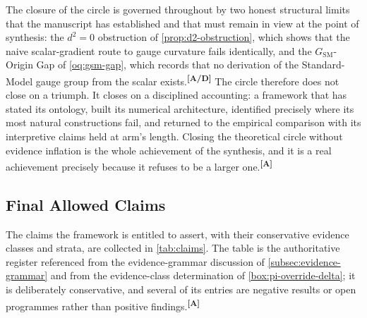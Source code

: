 \documentclass[12pt,a4paper,twoside]{article}
\theoremstyle{plain}
\theoremstyle{definition}
\theoremstyle{remark}
\newcommand{\catmark}[1]{\textsuperscript{\textsf{\textbf{[#1]}}}}
\begin{document}
The closure of the circle is governed throughout by two honest structural limits that the manuscript has established and that must remain in view at the point of synthesis: the $d^2 = 0$ obstruction of \cref{prop:d2-obstruction}, which shows that the naive scalar-gradient route to gauge curvature fails identically, and the $G_{\mathrm{SM}}$-Origin Gap of \cref{oq:gsm-gap}, which records that no derivation of the Standard-Model gauge group from the scalar exists.\catmark{A/D} The circle therefore does not close on a triumph. It closes on a disciplined accounting: a framework that has stated its ontology, built its numerical architecture, identified precisely where its most natural constructions fail, and returned to the empirical comparison with its interpretive claims held at arm's length. Closing the theoretical circle without evidence inflation is the whole achievement of the synthesis, and it is a real achievement precisely because it refuses to be a larger one.\catmark{A}

\subsection{Final Allowed Claims}
\label{sec:final-claims}

The claims the framework is entitled to assert, with their conservative evidence classes and strata, are collected in \cref{tab:claims}. The table is the authoritative register referenced from the evidence-grammar discussion of \cref{subsec:evidence-grammar} and from the evidence-class determination of \cref{box:pi-override-delta}; it is deliberately conservative, and several of its entries are negative results or open programmes rather than positive findings.\catmark{A}
\end{document}
